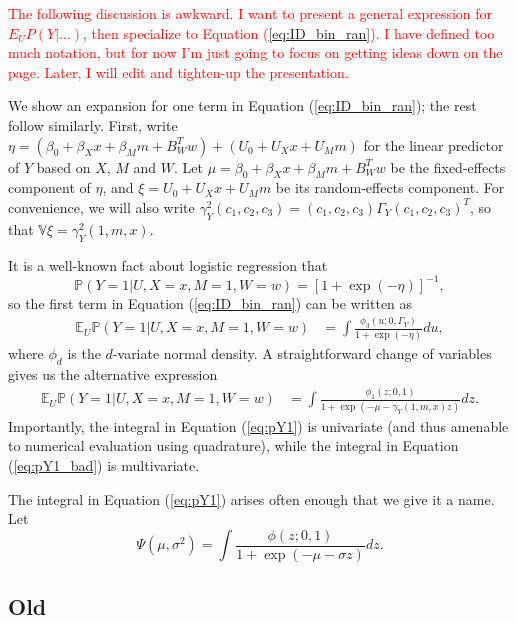 \documentclass{article}
\newcommand{\bP}{\mathbb{P}}
\newcommand{\bE}{\mathbb{E}}
\newcommand{\bV}{\mathbb{V}}
\begin{document}



\textcolor{red}{The following discussion is awkward. I want to present a general expression for $E_U P(Y | ...)$, then specialize to Equation (\ref{eq:ID_bin_ran}). I have defined too much notation, but for now I'm just going to focus on getting ideas down on the page. Later, I will edit and tighten-up the presentation.}


We show an expansion for one term in Equation (\ref{eq:ID_bin_ran}); the rest follow similarly. First, write $\eta = (\beta_0 + \beta_X x + \beta_M m + B_W^T w) + (U_0 + U_X x + U_M m)$ for the linear predictor of $Y$ based on $X$, $M$ and $W$. Let $\mu = \beta_0 + \beta_X x + \beta_M m + B_W^T w$ be the fixed-effects component of $\eta$, and $\xi = U_0 + U_X x + U_M m$ be its random-effects component. For convenience, we will also write $\gamma^2_Y(c_1, c_2, c_3) = (c_1, c_2, c_3) \Gamma_Y (c_1, c_2, c_3)^T$, so that $\bV \xi = \gamma^2_Y(1, m, x)$.

It is a well-known fact about logistic regression that
%
\begin{equation}
    \bP \left( Y=1 |U, X=x, M=1, W=w \right) = \left[1 + \exp(-\eta)\right]^{-1},
\end{equation}
%
so the first term in Equation (\ref{eq:ID_bin_ran}) can be written as
%
\begin{align}
    \bE_U \bP \left( Y=1 |U, X=x, M=1, W=w \right) & = \int \frac{\phi_3(u; 0, \Gamma_Y)}{1 + \exp(-\eta)} du, \label{eq:pY1_bad}
\end{align}
%
where $\phi_d$ is the $d$-variate normal density. A straightforward change of variables gives us the alternative expression
%
\begin{align}
    \bE_U \bP \left( Y=1 |U, X=x, M=1, W=w \right) & = \int \frac{\phi_1(z; 0, 1)}{1 + \exp(-\mu - \gamma_Y(1, m, x) z)} dz. \label{eq:pY1}
\end{align}
%
Importantly, the integral in Equation (\ref{eq:pY1}) is univariate (and thus amenable to numerical evaluation using quadrature), while the integral in Equation (\ref{eq:pY1_bad}) is multivariate.

The integral in Equation (\ref{eq:pY1}) arises often enough that we give it a name. Let
%
\begin{equation}
    \Psi(\mu, \sigma^2) = \int \frac{\phi(z; 0, 1)}{1 + \exp(-\mu - \sigma z)} dz.
\end{equation}


\subsection{Old}
\end{document}
